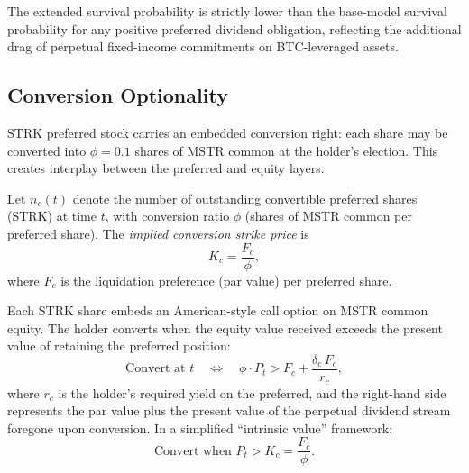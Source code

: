 \noindent The extended survival probability is strictly lower than the
base-model survival probability for any positive preferred dividend
obligation, reflecting the additional drag of perpetual fixed-income
commitments on BTC-leveraged assets.

\subsection{Conversion Optionality}\label{subsec:conversion}

STRK preferred stock carries an embedded conversion right: each share may
be converted into $\phi = 0.1$ shares of MSTR common at the holder's
election.  This creates interplay between the preferred and equity layers.

\begin{definition}\label{def:conversion}
Let $n_c(t)$ denote the number of outstanding convertible preferred shares
(STRK) at time $t$, with conversion ratio $\phi$ (shares of MSTR common
per preferred share).  The \emph{implied conversion strike price} is
\begin{equation}\label{eq:strike}
  K_c = \frac{F_c}{\phi},
\end{equation}
where $F_c$ is the liquidation preference (par value) per preferred share.
\end{definition}

\begin{proposition}\label{prop:conv_option}
Each STRK share embeds an American-style call option on MSTR common equity.
The holder converts when the equity value received exceeds the present value
of retaining the preferred position:
\begin{equation}\label{eq:conv_decision}
  \text{Convert at } t \quad\Longleftrightarrow\quad
  \phi \cdot P_t > F_c + \frac{\delta_c\, F_c}{r_c},
\end{equation}
where $r_c$ is the holder's required yield on the preferred, and the
right-hand side represents the par value plus the present value of the
perpetual dividend stream foregone upon conversion.  In a simplified
``intrinsic value'' framework:
\begin{equation}\label{eq:conv_intrinsic}
  \text{Convert when } P_t > K_c = \frac{F_c}{\phi}.
\end{equation}
\end{proposition}

